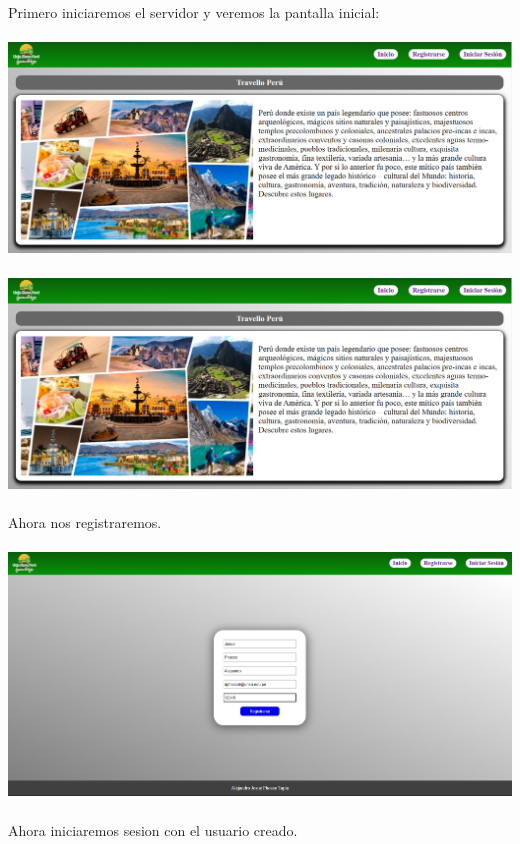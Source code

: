 \documentclass{article}
\begin{document}
            Primero iniciaremos el servidor y veremos la pantalla inicial:
            \\ \\
            \includegraphics[width=16cm]{img/INICIO1.png}
            \\ \\
            \includegraphics[width=16cm]{img/INICIO1.png}
            \\ \\
            Ahora nos registraremos.
            \\ \\
            \includegraphics[width=16cm]{img/REGISTRARSE.png}
            \\ \\
            Ahora iniciaremos sesion con el usuario creado.
            \\ \\
\end{document}
